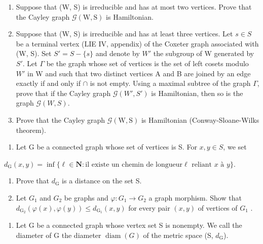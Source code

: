 \begin{enumerate}
\def\labelenumi{\alph{enumi})}
\item
  Suppose that (W, S) is irreducible and has at most two vertices. Prove that the Cayley graph \(\mathcal{G}(\mathrm{W},\mathrm{S})\) is Hamiltonian.
\item
  Suppose that (W, S) is irreducible and has at least three vertices. Let \(s \in S\) be a terminal vertex (LIE IV, appendix) of the Coxeter graph associated with (W, S). Set \(S' = S - \{s\}\) and denote by \(W'\) the subgroup of W generated by \(S'\). Let \(\Gamma\) be the graph whose set of vertices is the set of left cosets modulo \(W'\) in W and such that two distinct vertices A and B are joined by an edge exactly if and only if \(\cap\) is not empty. Using a maximal subtree of the graph \(\Gamma\), prove that if the Cayley graph \(\mathcal{G}(W', S')\) is Hamiltonian, then so is the graph \(\mathcal{G}(W, S)\).
\item
  Prove that the Cayley graph \(\mathcal{G}(\mathrm{W},\mathrm{S})\) is Hamiltonian (Conway-Sloane-Wilks theorem).
\end{enumerate}

\begin{enumerate}
\def\labelenumi{\arabic{enumi})}
\setcounter{enumi}{9}
\tightlist
\item
  Let G be a connected graph whose set of vertices is S. For \(x, y \in S\), we set
\end{enumerate}

\(d_{\mathrm{G}}(x,y) = \inf \{\ell \in \mathbf{N}\colon \text{il existe un chemin de longueur} \ell \text{ reliant } x \text{ à } y\}.\)

\begin{enumerate}
\def\labelenumi{\alph{enumi})}
\item
  Prove that \(d_{\mathrm{G}}\) is a distance on the set S.
\item
  Let \(G_{1}\) and \(G_{2}\) be graphs and \(\varphi\colon G_{1}\to G_{2}\) a graph morphism. Show that \(d_{\mathrm{G}_{2}}(\varphi(x),\varphi(y))\leqslant d_{\mathrm{G}_{1}}(x,y)\) for every pair \((x,y)\) of vertices of \(G_{1}\) .
\end{enumerate}

\begin{enumerate}
\def\labelenumi{\arabic{enumi})}
\setcounter{enumi}{10}
\tightlist
\item
  Let G be a connected graph whose vertex set S is nonempty. We call the diameter of G the diameter \(\operatorname{diam}(G)\) of the metric space (S, \(d_{\mathrm{G}}\)).
\end{enumerate}

